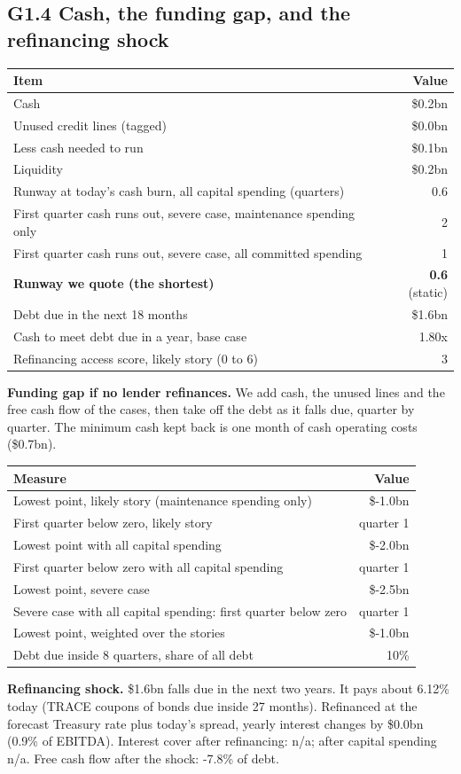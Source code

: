 \documentclass[11pt,a4paper]{article}
\begin{document}
\subsection*{G1.4 Cash, the funding gap, and the refinancing shock}
\begin{center}\footnotesize\setlength{\tabcolsep}{3.5pt}\begin{tabular}{@{}lr@{}}\toprule
Item & Value \\\midrule
Cash & \$0.2bn \\
Unused credit lines (tagged) & \$0.0bn \\
Less cash needed to run & \$0.1bn \\
Liquidity & \$0.2bn \\
Runway at today's cash burn, all capital spending (quarters) & 0.6 \\
First quarter cash runs out, severe case, maintenance spending only & 2 \\
First quarter cash runs out, severe case, all committed spending & 1 \\
\textbf{Runway we quote (the shortest)} & \textbf{0.6} (static) \\
Debt due in the next 18 months & \$1.6bn \\
Cash to meet debt due in a year, base case & 1.80x \\
Refinancing access score, likely story (0 to 6) & 3 \\
\bottomrule\end{tabular}\end{center}
\textbf{Funding gap if no lender refinances.} We add cash, the unused lines and the free cash flow of the cases, then take off the debt as it falls due, quarter by quarter. The minimum cash kept back is one month of cash operating costs (\$0.7bn).
\begin{center}\footnotesize\setlength{\tabcolsep}{3.5pt}\begin{tabular}{@{}lr@{}}\toprule
Measure & Value \\\midrule
Lowest point, likely story (maintenance spending only) & \$-1.0bn \\
First quarter below zero, likely story & quarter 1 \\
Lowest point with all capital spending & \$-2.0bn \\
First quarter below zero with all capital spending & quarter 1 \\
Lowest point, severe case & \$-2.5bn \\
Severe case with all capital spending: first quarter below zero & quarter 1 \\
Lowest point, weighted over the stories & \$-1.0bn \\
Debt due inside 8 quarters, share of all debt & 10\% \\
\bottomrule\end{tabular}\end{center}
\textbf{Refinancing shock.} \$1.6bn falls due in the next two years. It pays about 6.12\% today (TRACE coupons of bonds due inside 27 months). Refinanced at the forecast Treasury rate plus today's spread, yearly interest changes by \$0.0bn (0.9\% of EBITDA). Interest cover after refinancing: n/a; after capital spending n/a. Free cash flow after the shock: -7.8\% of debt.
\end{document}
